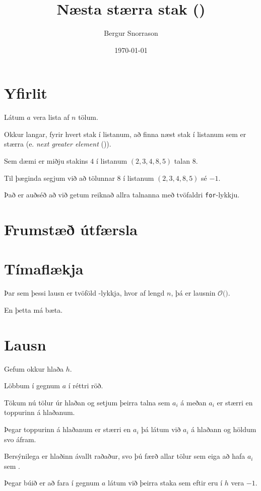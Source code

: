 \title{Næsta stærra stak ()}
\author{Bergur Snorrason}
\date{\today}



\frame{\titlepage}

\section{Yfirlit}
{
    {
        \item<1-> Látum $a$ vera lista af $n$ tölum.
        \item<2-> Okkur langar, fyrir hvert stak í listanum, að finna næst stak í listanum sem er stærra (e. \emph{next greater element} ()).
        \item<3-> Sem dæmi er  miðju stakins $4$ í listanum $(2, 3, 4, 8, 5)$ talan $8$.
        \item<4-> Til þæginda segjum við að  tölunnar $8$ í listanum $(2, 3, 4, 8, 5)$ sé $-1$.
        \item<5-> Það er auðséð að við getum reiknað  allra talnanna með tvöfaldri \texttt{for}-lykkju.
    }
}

\section{Frumstæð útfærsla}
{
}

\section{Tímaflækja}
{
    {
        \item<1-> Þar sem þessi lausn er tvöföld -lykkja, hvor af lengd $n$, þá er lausnin $\mathcal{O}($$)$.
        \item<3-> En þetta má bæta.
    }
}

\section{Lausn}
{
    {
        \item<1-> Gefum okkur hlaða $h$. 
        \item<2-> Löbbum í gegnum $a$ í réttri röð.
        \item<3-> Tökum nú tölur úr hlaðan og setjum  þeirra talna sem $a_i$ á meðan $a_i$ er stærri en toppurinn á hlaðanum.
        \item<4-> Þegar toppurinn á hlaðanum er stærri en $a_i$ þá látum við $a_i$ á hlaðann og höldum svo áfram.
        \item<5-> Bersýnilega er hlaðinn ávallt raðaður, svo þú færð allar tölur sem eiga að hafa $a_i$ sem .
        \item<6-> Þegar búið er að fara í gegnum $a$ látum við  þeirra staka sem eftir eru í $h$ vera $-1$.
    }
}

